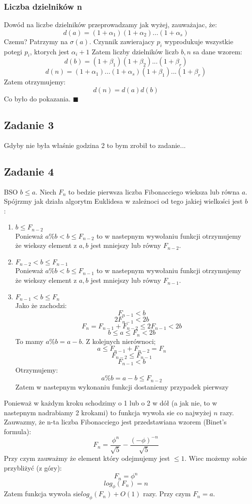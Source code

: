 \subsubsection{Liczba dzielników n}
Dowód na liczbe dzielników przeprowadzamy jak wyżej, zauważajac, że:
$$d(a) = (1+\alpha_1) ( 1+\alpha_2)... ( 1+\alpha_s)$$
Czemu? Patrzymy na $\sigma (a)$. Czynnik zawierajacy $p_i$ wyprodukuje wszystkie potegi $p_i$, ktorych jest $\alpha_i + 1$
Zatem liczby dzielników liczb $b, n$ sa dane wzorem:
$$d(b) = (1+\beta_1) ( 1+\beta_2)... ( 1+\beta_r)$$
$$d(n) = (1+\alpha_1)... ( 1+\alpha_s)(1+\beta_1)... ( 1+\beta_r)$$
Zatem otrzymujemy:
$$d(n) = d(a)d(b) $$
Co było do pokazania. $\blacksquare$

\subsection{Zadanie 3}
Gdyby nie była właśnie godzina 2 to bym zrobił to zadanie...

\subsection{Zadanie 4}
BSO $b\leq a$. Niech $F_n$ to bedzie pierwsza liczba Fibonacciego wieksza lub równa $a$. Spójrzmy jak działa algorytm Euklidesa w zależnoci od tego jakiej wielkości jest $b$:
\begin{enumerate}
\item $b\leq F_{n-2}$\\
Ponieważ $a\%b < b \leq F_{n-2}$ to w nastepnym wywołaniu funkcji otrzymujemy że wiekszy element z $a,b$ jest mniejszy lub równy $F_{n-2}$.
\item $F_{n-2}< b\leq F_{n-1}$\\
Ponieważ $a\%b < b \leq F_{n-1}$ to w nastepnym wywołaniu funkcji otrzymujemy że wiekszy element z $a,b$ jest mniejszy lub równy $F_{n-1}$.
\item  $F_{n-1}< b \leq F_{n}$\\
Jako że zachodzi:
$$F_{n-1}< b$$
$$2F_{n-1}< 2b$$
$$F_n=F_{n-1}+F_{n-2}\leq 2F_{n-1}< 2b$$
$$b \leq a \leq F_n < 2b$$
To mamy $a\%b = a-b$. Z kolejnych nierównoci;
$$a\leq F_{n-1}+F_{n-2} =  F_n$$
$$F_{n-2} \leq  F_{n-1}$$
$$F_{n-1}< b$$
Otrzymujemy:
$$a\%b=a-b\leq F_{n-2}$$
Zatem w nastepnym wykonaniu funkcji dostaniemy przypadek pierwszy
\end{enumerate}
Ponieważ w każdym kroku schodzimy o 1 lub o 2 w dół (a jak nie, to w nastepnym nadrabiamy 2 krokami) to funkcja wywoła sie co najwyżej $n$ razy.
Zauwazmy, że n-ta liczba Fibonacciego jest przedstawiana wzorem (Binet's formula):
$$F_n = \frac{\phi^n}{\sqrt{5}} -\frac{(- \phi)^{-n}}{\sqrt{5}}$$
Przy czym zauważmy że element który odejmujemy jest $\leq1$. Wiec możemy sobie przybliżyć (z góry):
$$F_n = \phi^n$$
$$log_{\phi}(F_n) = n$$
Zatem funkcja wywoła sie$ log_{\phi}(F_n) + O(1)$ razy. Przy czym $F_n = a$.

